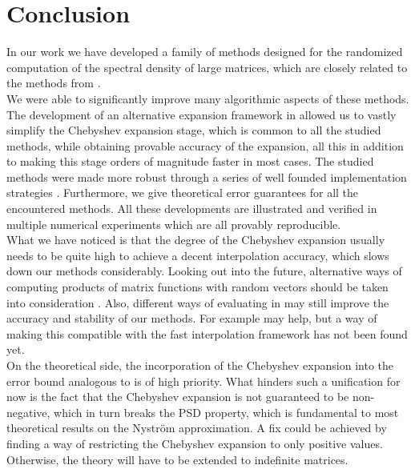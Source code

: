 \chapter{Conclusion}
\label{chp:6-conclusion}

In our work we have developed a family of methods
designed for the randomized computation of the spectral density of large matrices,
which are closely related to the methods from \cite{lin2017randomized}.\\

We were able to
significantly improve many algorithmic aspects of these methods. The development
of an alternative expansion framework in 
allowed us to vastly simplify the Chebyshev expansion stage, which is common to all the
studied methods, while obtaining provable accuracy of the expansion, all this in
addition to making this stage orders of magnitude faster in most cases. 
The studied methods were made more robust through a series of well founded
implementation strategies .
Furthermore, we give theoretical error guarantees for all the encountered methods.
All these developments are illustrated and verified in multiple numerical experiments
which are all provably reproducible.\\

What we have noticed is that the degree of the Chebyshev expansion usually needs
to be quite high to achieve a decent interpolation accuracy, which slows down
our methods considerably. Looking out into the future, alternative ways of
computing products of matrix functions with random vectors should be taken into
consideration \cite{cortinovis2023speeding,ubaru2017lanczos}. Also, different ways
of evaluating  in 
may still improve the accuracy and stability of our methods. For example
\cite[algorithm~5.6]{tropp2023randomized} may help, but a way of making this
compatible with the fast interpolation framework has not been found yet.\\

On the theoretical side, the incorporation of the Chebyshev expansion into the
error bound analogous to  is of high priority.
What hinders such a unification for now is the fact that the Chebyshev expansion
is not guaranteed to be non-negative, which in turn breaks the \gls{PSD} property,
which is fundamental to most theoretical results on the Nystr\"om approximation.
A fix could be achieved by finding a way of restricting the Chebyshev expansion
to only positive values. Otherwise, the theory will have to be extended to
indefinite matrices.
